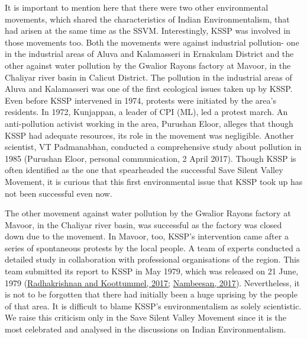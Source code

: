 \documentclass[twoside, 13pt]{article}
\begin{document}
{{\fontsize{12}{14}\selectfont
It is important to mention here that there were two other environmental movements, which shared the characteristics of Indian Environmentalism, that had arisen at the same time as the SSVM. Interestingly, KSSP was involved in those movements too. Both the movements were against industrial pollution- one in the industrial areas of Aluva and Kalamasseri in Ernakulam District and the other against water pollution by the Gwalior Rayons factory at Mavoor, in the Chaliyar river basin in Calicut District. The pollution in the industrial areas of Aluva and Kalamasseri was one of the first ecological issues taken up by KSSP. Even before KSSP intervened in 1974, protests were initiated by the area’s residents. In 1972, Kunjappan, a leader of CPI (ML), led a protest march. An anti-pollution activist working in the area, Purushan Eloor, alleges that though KSSP had adequate resources, its role in the movement was negligible. Another scientist, VT Padmanabhan, conducted a comprehensive study about pollution in 1985 (Purushan Eloor, personal communication, 2 April 2017). Though KSSP is often identified as the one that spearheaded the successful Save Silent Valley Movement, it is curious that this first environmental issue that KSSP took up has not been successful even now.

The other movement against water pollution by the Gwalior Rayons factory at Mavoor, in the Chaliyar river basin, was successful as the factory was closed down due to the movement. In Mavoor, too, KSSP’s intervention came after a series of spontaneous protests by the local people. A team of experts conducted a detailed study in collaboration with professional organisations of the region. This team submitted its report to KSSP in May 1979, which was released on 21 June, 1979 (\underline{Radhakrishnan and Koottummel, 2017;} \underline{Nambeesan, 2017}). Nevertheless, it is not to be forgotten that there had initially been a huge uprising by the people of that area. It is difficult to blame KSSP’s environmentalism as solely scientistic. We raise this criticism only in the Save Silent Valley Movement since it is the most celebrated and analysed in the discussions on Indian Environmentalism. }

}
\end{document}
